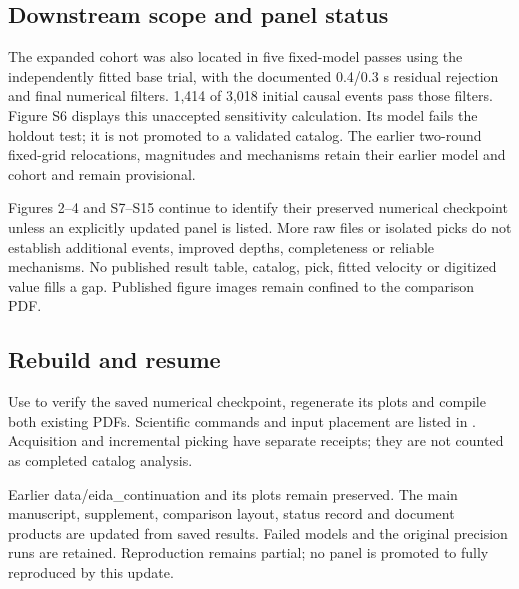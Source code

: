 \subsection*{Downstream scope and panel status}

The expanded cohort was also located in five fixed-model passes using the independently fitted base trial, with the documented 0.4/0.3 s residual rejection and final numerical filters. 1,414 of 3,018 initial causal events pass those filters. Figure S6 displays this unaccepted sensitivity calculation. Its model fails the holdout test; it is not promoted to a validated catalog. The earlier two-round fixed-grid relocations, magnitudes and mechanisms retain their earlier model and cohort and remain provisional.

\par{\footnotesize{}}

Figures 2--4 and S7--S15 continue to identify their preserved numerical checkpoint unless an explicitly updated panel is listed. More raw files or isolated picks do not establish additional events, improved depths, completeness or reliable mechanisms. No published result table, catalog, pick, fitted velocity or digitized value fills a gap. Published figure images remain confined to the comparison PDF.

\subsection*{Rebuild and resume}

Use  to verify the saved numerical checkpoint, regenerate its plots and compile both existing PDFs. Scientific commands and input placement are listed in . Acquisition and incremental picking have separate receipts; they are not counted as completed catalog analysis.

Earlier data/eida\_continuation and its plots remain preserved. The main manuscript, supplement, comparison layout, status record and document products are updated from saved results. Failed models and the original precision runs are retained. Reproduction remains partial; no panel is promoted to fully reproduced by this update.
